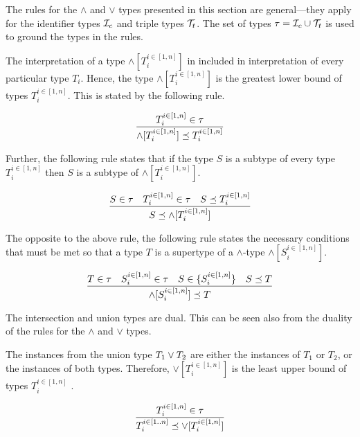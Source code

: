 \documentclass[runningheads]{llncs}
\newcommand{\I}{{\cal I}}
\newcommand{\T}{{\cal T}}
\begin{document}
The rules for the $\land$ and $\lor$ types presented in this section
are general---they apply for the identifier types $\I_c$ and triple
types $\T_t$. The set of types $\tau=\I_c\cup\T_t$ is used to ground
the types in the rules.

The interpretation of a type $\land[T_i^{i\in[1,n]}]$ in included in
interpretation of every particular type $T_i$. Hence, the type
$\land[T_i^{i\in[1,n]}]$ is the greatest lower bound of types
$T_i^{i\in[1,n]}$. This is stated by the following rule.

\begin{equation}
\label{rul:land-preceq-elems}
\dfrac{T_i^{i\in[1,n]}\in\tau}
      {\land[T_i^{i\in[1,n]}] \preceq\/T_i^{i\in[1,n]}} 
\end{equation}

Further, the following rule states that if the type $S$ is a subtype
of every type $T_i^{i\in[1,n]}$ then $S$ is a subtype of
$\land[T_i^{i\in[1,n]}]$.

\begin{equation}
\label{rul:lbound-preceq-land}
\dfrac{S\in\tau\quad\/T_i^{i\in[1,n]}\in\tau\quad\/S\preceq\/T_i^{i\in[1,n]}}
      {S\preceq\land[T_i^{i\in[1,n]}]}  
\end{equation} 

The opposite to the above rule, the following rule states the
necessary conditions that must be met so that a type $T$ is a
supertype of a $\land$-type $\land[S_i^{i\in[1,n]}]$.

\begin{equation}
\label{rul:land-preceq-ubound}
\dfrac{T\in\tau\quad\/S_i^{i\in[1,n]}\in\tau\quad\/S\in\{S_i^{i\in[1,n]}\}\quad\/S\preceq\/T}
      {\land[S_i^{i\in[1,n]}]\preceq\/T}  
\end{equation} 

The intersection and union types are dual. This can be seen also from
the duality of the rules for the $\land$ and $\lor$ types.

The instances from the union type $T_1\lor\/T_2$ are either the
instances of $T_1$ or $T_2$, or the instances of both
types. Therefore, $\lor[T_i^{i\in[1,n]}]$ is the least upper bound of
types $T_i^{i\in[1,n]}$ \cite{Pierce1991}.

\begin{equation}
\label{rul:lor-preceq-elems}
\dfrac{T_i^{i\in[1,n]}\in\tau}
      {T_i^{i\in[1..n]}\preceq\/\lor[T_i^{i\in[1,n]}]}
\end{equation}
\end{document}
